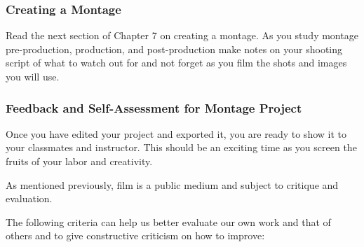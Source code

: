 \documentclass[
]{book}
\begin{document}
\begin{reflect}
\hypertarget{creating-a-montage}{%
\subsubsection*{Creating a Montage}\label{creating-a-montage}}

Read the next section of Chapter 7 on creating a montage. As you study montage pre-production, production, and post-production make notes on your shooting script of what to watch out for and not forget as you film the shots and images you will use.

\hypertarget{feedback-and-self-assessment-for-montage-project}{%
\subsubsection*{Feedback and Self-Assessment for Montage Project}\label{feedback-and-self-assessment-for-montage-project}}

Once you have edited your project and exported it, you are ready to show it to your classmates and instructor. This should be an exciting time as you screen the fruits of your labor and creativity.

As mentioned previously, film is a public medium and subject to critique and evaluation.

The following criteria can help us better evaluate our own work and that of others and to give constructive criticism on how to improve:


\end{reflect}
\end{document}
